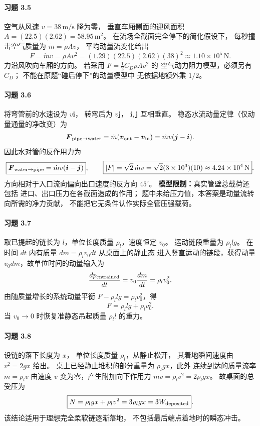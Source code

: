 \paragraph{习题 3.5}
空气从风速 \(v=38\,\mathrm{m/s}\) 降为零，
垂直车厢侧面的迎风面积
\(A=(22.5)(2.62)=58.95\,\mathrm{m^2}\)。
在流场全截面完全停下的简化假设下，
每秒撞击空气质量为
\(\dot m=\rho Av\)，
平均动量流变化给出
\[
 \boxed{F=\dot mv=\rho Av^2
 =(1.29)(22.5)(2.62)(38)^2
 \approx1.10\times10^5\,\mathrm N}.
\]
力沿风吹向车厢的方向。
若采用 \(F=\frac12C_D\rho Av^2\) 的
空气动力阻力模型，必须另有 \(C_D\)；
不能在原题“碰后停下”的动量模型中
无依据地额外乘 \(1/2\)。

\paragraph{习题 3.6}
将弯管前的水速设为 \(v\boldsymbol i\)，
转弯后为 \(v\boldsymbol j\)，
\(\boldsymbol i,\boldsymbol j\) 互相垂直。
稳态水流动量定律（仅动量通量的净改变）为
\[
 \boldsymbol F_{\rm pipe\to water}
 =\dot m(\boldsymbol v_{\rm out}-\boldsymbol v_{\rm in})
 =\dot mv(\boldsymbol j-\boldsymbol i).
\]
因此水对管的反作用力为
\[
 \boxed{\boldsymbol F_{\rm water\to pipe}
 =\dot mv(\boldsymbol i-\boldsymbol j)},\qquad
 \boxed{|F|=\sqrt2\,\dot mv
 =\sqrt2(3\times10^3)(10)
 \approx4.24\times10^4\,\mathrm N}.
\]
方向相对于入口流向偏向出口速度的反方向
\(45^\circ\)。
\textbf{模型限制：}真实管壁总载荷还包括
进口、出口压力在各截面造成的作用；
题中未给压力值，本答案是动量流转向所需的净力贡献，
不能把它无条件认作实际全管压强载荷。

\paragraph{习题 3.7}
取已提起的链长为 \(l\)，单位长度质量
\(\rho_l\)，速度恒定 \(v_0\)。
运动链段重量为 \(\rho_l lg\)。
在时间 \(dt\) 内有质量
\(dm=\rho_lv_0dt\) 从桌面上的静止态
进入竖直运动的链段，获得动量
\(v_0dm\)，故单位时间的动量输入为
\[
 \frac{d p_{\rm entrained}}{dt}
 =v_0\frac{dm}{dt}=\rho_lv_0^2.
\]
由随质量增长的系统动量平衡
\(F-\rho_l lg=\rho_lv_0^2\)，得
\[
 \boxed{F=\rho_l lg+\rho_lv_0^2}.
\]
当 \(v_0\to0\) 时恢复准静态吊起质量
\(\rho_l l\) 的重力。

\paragraph{习题 3.8}
设链的落下长度为 \(x\)，
单位长度质量 \(\rho_l\)，从静止松开，
其着地瞬间速度由
\(v^2=2gx\) 给出。
桌上已经静止堆积的部分重量为
\(\rho_l gx\)，此外
连续到达的质量流率
\(\dot m=\rho_lv\) 由速度 \(v\)
变为零，产生附加向下作用力
\(\dot mv=\rho_lv^2=2\rho_lgx\)。
故桌面的总受压为
\[
 \boxed{N=\rho_lgx+\rho_lv^2
 =3\rho_lgx=3W_{\rm deposited}}.
\]
该结论适用于理想完全柔软链逐渐落地，
不包括最后端点着地时的瞬态冲击。

